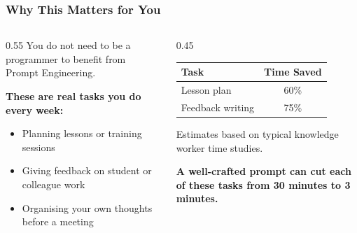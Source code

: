 \begin{frame}[fragile]\frametitle{Why This Matters for You}

\begin{columns}
    \begin{column}[T]{0.55\linewidth}
    You do not need to be a programmer to benefit from Prompt Engineering.

    \medskip
    \textbf{These are real tasks you do every week:}
    \begin{itemize}
        \item Planning lessons or training sessions
        \item Giving feedback on student or colleague work
        \item Organising your own thoughts before a meeting
    \end{itemize}
    \end{column}
    \begin{column}[T]{0.45\linewidth}
    \begin{center}
    \renewcommand{\arraystretch}{1.4}
    \begin{tabular}{|l|c|}
    \hline
    \textbf{Task} & \textbf{Time Saved} \\
    \hline
    Lesson plan & 60\% \\
    Feedback writing & 75\% \\
    \hline
    \end{tabular}
    \end{center}
    \medskip
    {\tiny Estimates based on typical knowledge worker time studies.}
	
	    \textbf{A well-crafted prompt can cut each of these tasks from 30 minutes to 3 minutes.}
    \end{column}
\end{columns}

\end{frame}


